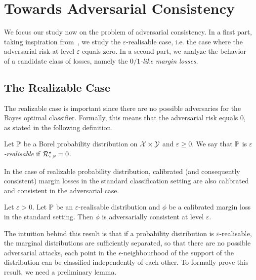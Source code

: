 \section{Towards Adversarial Consistency}
\label{sec:consistency}
We focus our study now on the problem of adversarial consistency. In a first part, taking inspiration from~\citet{long2013consistency,awasthi2021calibration}, we study the $\varepsilon$-realisable case, i.e. the case where the adversarial risk at level $\varepsilon$ equals zero. In a second part, we analyze the behavior of a candidate class of losses, namely the \emph{$0/1$-like margin losses}.



\subsection{The Realizable Case}
The realizable case is important since there are no possible adversaries for the Bayes optimal classifier. Formally, this means that the adversarial risk equals $0$, as stated in the following definition.

\begin{definition}
Let $\mathbb{P}$ be a Borel probability distribution on $\mathcal{X}\times\mathcal{Y}$ and $\varepsilon\geq0$. We say that $\mathbb{P}$ is \emph{$\varepsilon$-realisable} if $\mathcal{R}_{\varepsilon,\mathbb{P}}^\star = 0$.
\end{definition}


In the case of realizable probability distribution, calibrated (and consequently consistent) margin losses in the standard classification setting are also calibrated and consistent in the adversarial case. 
\begin{prop}
\label{prop:realizable} 
Let $\varepsilon>0$. Let $\mathbb{P}$ be an $\varepsilon$-realisable distribution and $\phi$ be a calibrated margin loss in the standard setting. Then $\phi$ is adversarially consistent at level $\varepsilon$. 
\end{prop}
The intuition behind this result is that if a probability distribution is $\varepsilon$-realisable, the marginal distributions are sufficiently separated, so that there are no possible adversarial attacks, each point in the $\epsilon$-neighbourhood of the support of the distribution can be classified independently of each other. To formally prove this result, we need a preliminary lemma.


